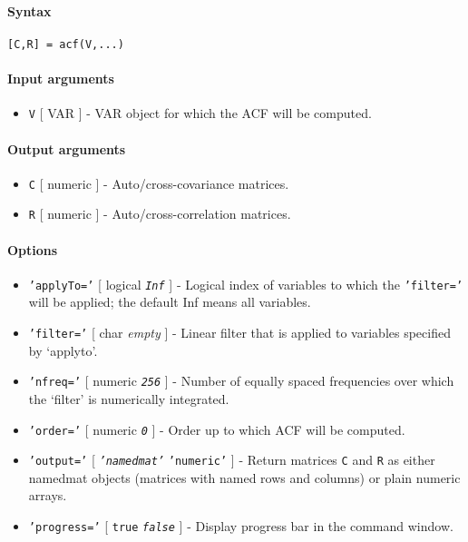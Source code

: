 


	\paragraph{Syntax}\label{syntax}

\begin{verbatim}
[C,R] = acf(V,...)
\end{verbatim}

\paragraph{Input arguments}\label{input-arguments}

\begin{itemize}
\itemsep1pt\parskip0pt
\item
  \texttt{V} {[} VAR {]} - VAR object for which the ACF will be
  computed.
\end{itemize}

\paragraph{Output arguments}\label{output-arguments}

\begin{itemize}
\item
  \texttt{C} {[} numeric {]} - Auto/cross-covariance matrices.
\item
  \texttt{R} {[} numeric {]} - Auto/cross-correlation matrices.
\end{itemize}

\paragraph{Options}\label{options}

\begin{itemize}
\item
  \texttt{'applyTo='} {[} logical \textbar{} \emph{\texttt{Inf}} {]} -
  Logical index of variables to which the \texttt{'filter='} will be
  applied; the default Inf means all variables.
\item
  \texttt{'filter='} {[} char \textbar{} \emph{empty} {]} - Linear
  filter that is applied to variables specified by `applyto'.
\item
  \texttt{'nfreq='} {[} numeric \textbar{} \emph{\texttt{256}} {]} -
  Number of equally spaced frequencies over which the `filter' is
  numerically integrated.
\item
  \texttt{'order='} {[} numeric \textbar{} \emph{\texttt{0}} {]} - Order
  up to which ACF will be computed.
\item
  \texttt{'output='} {[} \emph{\texttt{'namedmat'}} \textbar{}
  \texttt{'numeric'} {]} - Return matrices \texttt{C} and \texttt{R} as
  either namedmat objects (matrices with named rows and columns) or
  plain numeric arrays.
\item
  \texttt{'progress='} {[} \texttt{true} \textbar{}
  \emph{\texttt{false}} {]} - Display progress bar in the command
  window.
\end{itemize}

